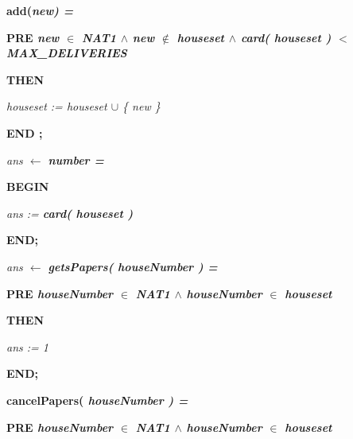 \documentclass[11pt]{article}
\begin{document}
\begin{sloppypar}
\hspace*{0.40in}

\hspace*{0.40in}\bf add\rm (\it new\rm ) \rm =

\hspace*{0.60in}\bf PRE \it new  $\in$  \bf NAT1  $\land$  \it new  $\not\in$  \it houseset  $\land$  \bf card\rm ( \it houseset \rm ) $<$ \it MAX\_DELIVERIES\hspace*{0.40in}

\hspace*{0.60in}\bf THEN

\hspace*{0.80in}\it houseset \rm := \it houseset  $\cup$  \rm \{ \it new \rm \}

\hspace*{0.60in}\bf END \rm ;

\hspace*{0.20in}

\hspace*{0.40in}\it ans  $\leftarrow$  \bf number \rm =

\hspace*{0.60in}\bf BEGIN

\hspace*{0.80in}\it ans \rm := \bf card\rm ( \it houseset \rm )

\hspace*{0.60in}\bf END\rm ;

\hspace*{0.20in}

\hspace*{0.40in}\it ans  $\leftarrow$  \bf getsPapers\rm ( \it houseNumber \rm ) \rm =

\hspace*{0.60in}\bf PRE \it houseNumber  $\in$  \bf NAT1  $\land$  \it houseNumber  $\in$  \it houseset

\hspace*{0.60in}\bf THEN

\hspace*{0.80in}\it ans \rm := \rm 1

\hspace*{0.60in}\bf END\rm ;

\hspace*{0.40in}

\hspace*{0.40in}\bf cancelPapers\rm ( \it houseNumber \rm ) \rm =

\hspace*{0.60in}\bf PRE \it houseNumber  $\in$  \bf NAT1  $\land$  \it houseNumber  $\in$  \it houseset


\end{sloppypar}
\end{document}
